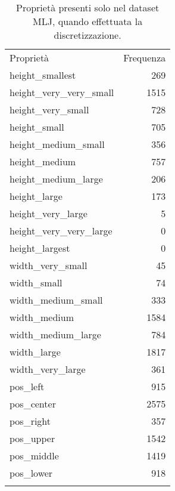 \begin{table}[H]
\centering
\label{tab:frequenzaPredicat}
\small\begin{tabular}{lr}
\toprule
\addlinespace
Proprietà & Frequenza \\
\addlinespace
\midrule
\addlinespace
height\_smallest & 269 \\
height\_very\_very\_small & 1515 \\
height\_very\_small & 728 \\
height\_small & 705 \\
height\_medium\_small & 356 \\
height\_medium & 757 \\
height\_medium\_large & 206 \\
height\_large & 173 \\
height\_very\_large & 5 \\
height\_very\_very\_large & 0 \\
height\_largest & 0 \\
width\_very\_small & 45 \\
width\_small & 74 \\
width\_medium\_small & 333 \\
width\_medium & 1584 \\
width\_medium\_large & 784 \\
width\_large & 1817 \\
width\_very\_large & 361 \\
pos\_left & 915 \\
pos\_center & 2575 \\
pos\_right & 357 \\
pos\_upper & 1542 \\
pos\_middle & 1419 \\
pos\_lower & 918 \\
\addlinespace
\bottomrule
\end{tabular}
\caption[Proprieta MLJ discretizzato]{Proprietà presenti solo nel dataset MLJ, quando effettuata la discretizzazione.}
\end{table}